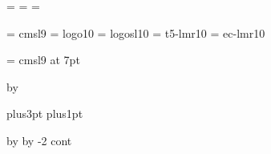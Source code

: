 % 






\TUBfinal

\headmargin=\normalheadmargin
\rheadlgt=\normalrheadlgt
\collgt=\normalcollgt
\resetpagelgt

\let\runhead=\normalrunhead
\let\runfoot=\normalrunfoot

\tenpoint\baselineskip=12.5pt       %
  \font\slnine = cmsl9
  \font\manual = logo10
  \font\manualsl = logosl10
  \font\thanhfont = t5-lmr10
  \font\lslashfont = ec-lmr10


\font\slc = cmsl9 at 7pt  %

\LoadSansFonts
\Trimmarkstrue
\NoBlackBoxes
\def\rtitle{}

\vfuzz=0pc 			%
  \advance\vsize by \vfuzz

\secskipa=6.0pt plus3pt       %
\secskipb=1.5pt plus1pt       %

% 
{
 \hfuzz=2pc                     %
 \advance\hsize by \hfuzz
 \advance\voffset by -2\baselineskip %
 \Input cont
}
\bye %
